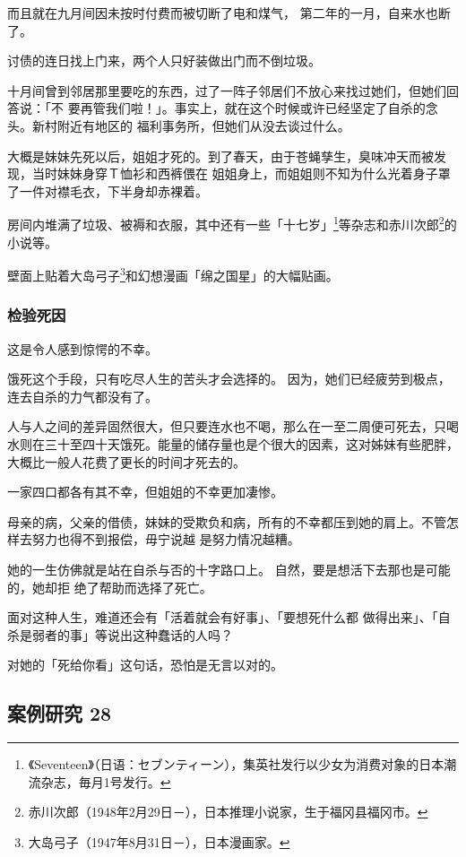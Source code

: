 \documentclass[UTF8]{ctexart}
\begin{document}
而且就在九月间因未按时付费而被切断了电和煤气， 第二年的一月，自来水也断了。

讨债的连日找上门来，两个人只好装做出门而不倒垃圾。

十月间曾到邻居那里要吃的东西，过了一阵子邻居们不放心来找过她们，但她们回答说：「不 要再管我们啦！」。事实上，就在这个时候或许已经坚定了自杀的念头。新村附近有地区的 福利事务所，但她们从没去谈过什么。

大概是妹妹先死以后，姐姐才死的。到了春天，由于苍蝇孳生，臭味冲天而被发现，当时妹妹身穿Ｔ恤衫和西裤偎在 姐姐身上，而姐姐则不知为什么光着身子罩了一件对襟毛衣，下半身却赤裸着。

房间内堆满了垃圾、被褥和衣服，其中还有一些「十七岁」\footnote{《Seventeen》（日语：セブンティーン），集英社发行以少女为消费对象的日本潮流杂志，毎月1号发行。}等杂志和赤川次郎\footnote{赤川次郎（1948年2月29日－\qquad \qquad），日本推理小说家，生于福冈县福冈市。}的小说等。

壁面上贴着大岛弓子\footnote{大岛弓子（1947年8月31日－\qquad \qquad ），日本漫画家。}和幻想漫画「绵之国星」的大幅贴画。

\subsubsection*{检验死因}

这是令人感到惊愕的不幸。

饿死这个手段，只有吃尽人生的苦头才会选择的。
因为，她们已经疲劳到极点，连去自杀的力气都没有了。

人与人之间的差异固然很大，但只要连水也不喝，那么在一至二周便可死去，只喝水则在三十至四十天饿死。能量的储存量也是个很大的因素，这对姊妹有些肥胖，大概比一般人花费了更长的时间才死去的。

一家四口都各有其不幸，但姐姐的不幸更加凄惨。

母亲的病，父亲的借债，妹妹的受欺负和病，所有的不幸都压到她的肩上。不管怎样去努力也得不到报偿，毋宁说越 是努力情况越糟。

她的一生仿佛就是站在自杀与否的十字路口上。
自然，要是想活下去那也是可能的，她却拒 绝了帮助而选择了死亡。

面对这种人生，难道还会有「活着就会有好事」、「要想死什么都 做得出来」、「自杀是弱者的事」等说出这种蠢话的人吗？

对她的「死给你看」这句话，恐怕是无言以对的。



\subsection{案例研究 28}
\end{document}
